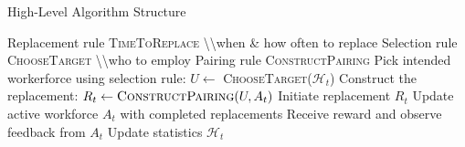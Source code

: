 \documentclass[10pt,aspectratio=169]{beamer}
\begin{document}
\begin{frame}{High-Level Algorithm Structure}
    \begin{algorithm}[H]
    \small
    \begin{algorithmic}[1]
    \REQUIRE Replacement rule \textsc{TimeToReplace} \qquad \alert{\textbackslash \textbackslash when \& how often to replace}
    \REQUIRE Selection rule \textsc{ChooseTarget} \qquad \qquad  \alert{ \textbackslash \textbackslash who to employ}
    \REQUIRE Pairing rule \textsc{ConstructPairing}
            \STATE Pick intended workerforce using selection rule: $U\gets$ \textsc{ChooseTarget}(\(\mathcal{H}_t\))
            \STATE Construct the replacement: \(R_t\gets \textsc{ConstructPairing}(U, A_t)\)
            \STATE Initiate replacement \(R_t\)
        \ENDIF
        \STATE Update active workforce \(A_t\) with completed replacements
        \STATE Receive reward and observe feedback from \(A_t\)
        \STATE Update statistics \(\mathcal{H}_t\)
    \ENDFOR
    \end{algorithmic}
    \end{algorithm}
\end{frame}
\end{document}
